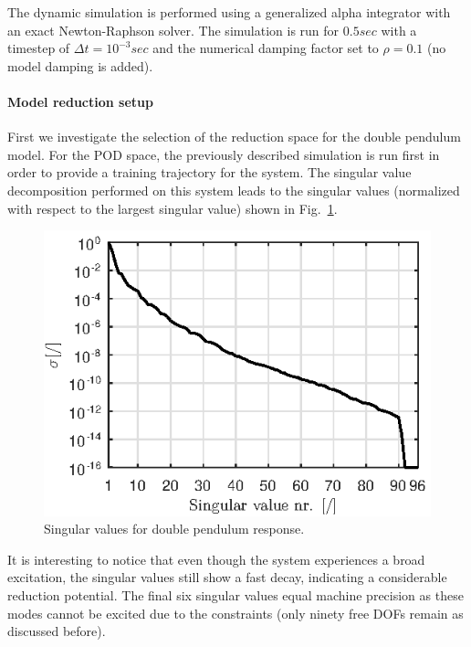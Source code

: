 The dynamic simulation is performed using a generalized alpha integrator with an exact Newton-Raphson solver\cite{BrulsGenAlpha}. The simulation is run for $0.5sec$ with a timestep of $\Delta t = 10^{-3}sec$ and the numerical damping factor set to $\rho = 0.1$ (no model damping is added). 

\paragraph{Model reduction setup}
First we investigate the selection of the reduction space for the double pendulum model. For the POD space, the previously described simulation is run first in order to provide a training trajectory for the system. The singular value decomposition performed on this system leads to the singular values (normalized with respect to the largest singular value) shown in Fig.~\ref{fig:DoublePendulumSigmas}.
\begin{figure}[htp]
\centering
\includegraphics[scale=1]{DoublePendulumPODSigmas.eps} 
\caption{Singular values for double pendulum response.}
\label{fig:DoublePendulumSigmas}
\end{figure}
It is interesting to notice that even though the system experiences a broad excitation,  the singular values still show a fast decay, indicating a considerable reduction potential. The final six singular values equal machine precision as these modes cannot be excited due to the constraints (only ninety free DOFs remain as discussed before). 


